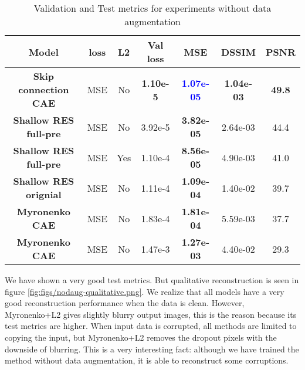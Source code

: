 \begin{table}[!ht]
  \begin{center}
   \setlength\extrarowheight{2pt} %
   \begin{tabular}{c c c | c | >{\bf}c c c}
    \toprule
    \textbf{Model} & \textbf{loss}  & \textbf{L2}  & \textbf{Val loss}  & \textbf{MSE}               & \textbf{DSSIM} & \textbf{PSNR} \\
    \hline   
    \textbf{Skip connection CAE}   & MSE & No  & \textbf{1.10e-5}   & \textcolor{blue}{1.07e-05} &\textbf{ 1.04e-03} &		\textbf{49.8} \\
    \textbf{Shallow RES full-pre}  & MSE & No  & 3.92e-5            & 3.82e-05                   & 2.64e-03	&	44.4\\
    \textbf{Shallow RES full-pre}  & MSE & Yes & 1.10e-4            & 8.56e-05                   & 4.90e-03	&	41.0 \\
    \textbf{Shallow RES orignial}  & MSE & No  & 1.11e-4            & 1.09e-04                   & 1.40e-02	&	39.7 \\
    \textbf{Myronenko CAE}         & MSE & No  & 1.83e-4            & 1.81e-04                   & 5.59e-03	&	37.7 \\
    \textbf{Myronenko CAE}         & MSE & No  & 1.47e-3            & 1.27e-03                   & 4.40e-02	&	29.3 \\
    \bottomrule
    \end{tabular}
    \end{center}
    \caption{Validation and Test metrics for experiments without data augmentation}
    \label{table:expnodaug}
\end{table}


We have shown a very good test metrics. But qualitative reconstruction is seen in figure \ref{fig:figs/nodaug-qualitative.png}. We realize that all models have a very good reconstruction performance when the data is clean. However, Myronenko+L2 gives slightly blurry output images, this is the reason because its test metrics are higher. When input data is corrupted, all methods are limited to copying the input, but Myronenko+L2 removes the dropout pixels with the downside of blurring. This is a very interesting fact: although we have trained the method without data augmentation, it is able to reconstruct some corruptions.

